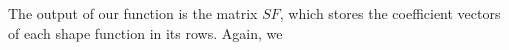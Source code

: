 \documentclass[a4paper,12pt]{article}
\begin{document}
The output of our function is the matrix $SF$, which stores the coefficient vectors of each shape function in its rows. Again, we 
\end{document}
